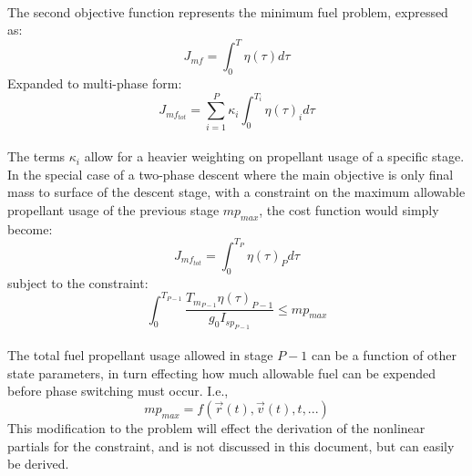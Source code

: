 \paragraph{}
The second objective function represents the minimum fuel problem, expressed as:
\begin{equation}
J_{mf} = \int_{0}^{T} \eta(\tau) d\tau
\end{equation}
Expanded to multi-phase form:
\begin{equation}
J_{mf_{tot}} = \sum_{i=1}^{P} \kappa_i \int_{0}^{T_i} \eta(\tau)_i d\tau
\end{equation}
\paragraph{}
The terms $\kappa_i$ allow for a heavier weighting on propellant usage of a specific stage. In the special case of a two-phase descent where the main objective is only final mass to surface of the descent stage, with a constraint on the maximum allowable propellant usage of the previous stage $mp_{max}$, the cost function would simply become:
\begin{equation}
J_{mf_{tot}} = \int_{0}^{T_P} \eta(\tau)_P d\tau
\end{equation}
subject to the constraint:
\begin{equation}
\int_{0}^{T_{P-1}} \frac{T_{m_{P-1}} \eta(\tau)_{P-1}}{g_0 I_{sp_{P-1}}} \leq mp_{max}
\end{equation}
\paragraph{}
The total fuel propellant usage allowed in stage $P-1$ can be a function of other state parameters, in turn effecting how much allowable fuel can be expended before phase switching must occur. I.e.,
\begin{equation}
mp_{max} = f(\vec{r}(t), \vec{v}(t), t, ... )
\end{equation}
This modification to the problem will effect the derivation of the nonlinear partials for the constraint, and is not discussed in this document, but can easily be derived.

























